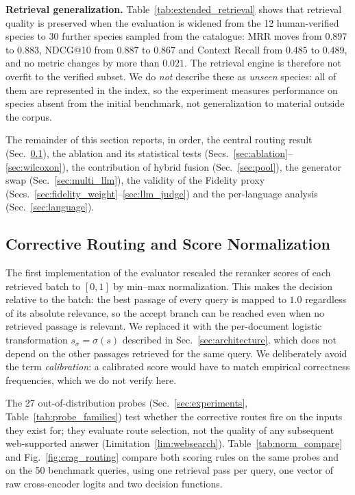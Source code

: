 \documentclass[runningheads]{llncs}
\begin{document}
\textbf{Retrieval generalization.} Table~\ref{tab:extended_retrieval} shows that retrieval quality is preserved when the evaluation is widened from the 12 human-verified species to 30 further species sampled from the catalogue: MRR moves from $0.897$ to $0.883$, NDCG@10 from $0.887$ to $0.867$ and Context Recall from $0.485$ to $0.489$, and no metric changes by more than $0.021$. The retrieval engine is therefore not overfit to the verified subset. We do \emph{not} describe these as \emph{unseen} species: all of them are represented in the index, so the experiment measures performance on species absent from the initial benchmark, not generalization to material outside the corpus.

The remainder of this section reports, in order, the central routing result (Sec.~\ref{sec:crag_validation}), the ablation and its statistical tests (Secs.~\ref{sec:ablation}--\ref{sec:wilcoxon}), the contribution of hybrid fusion (Sec.~\ref{sec:pool}), the generator swap (Sec.~\ref{sec:multi_llm}), the validity of the Fidelity proxy (Secs.~\ref{sec:fidelity_weight}--\ref{sec:llm_judge}) and the per-language analysis (Sec.~\ref{sec:language}).

\subsection{Corrective Routing and Score Normalization}
\label{sec:crag_validation}

The first implementation of the evaluator rescaled the reranker scores of each retrieved batch to $[0,1]$ by min--max normalization. This makes the decision relative to the batch: the best passage of every query is mapped to $1.0$ regardless of its absolute relevance, so the accept branch can be reached even when no retrieved passage is relevant. We replaced it with the per-document logistic transformation $s_\sigma{=}\sigma(s)$ described in Sec.~\ref{sec:architecture}, which does not depend on the other passages retrieved for the same query. We deliberately avoid the term \emph{calibration}: a calibrated score would have to match empirical correctness frequencies, which we do not verify here.

The 27 out-of-distribution probes (Sec.~\ref{sec:experiments}, Table~\ref{tab:probe_families}) test whether the corrective routes fire on the inputs they exist for; they evaluate route selection, not the quality of any subsequent web-supported answer (Limitation~\ref{lim:websearch}). Table~\ref{tab:norm_compare} and Fig.~\ref{fig:crag_routing} compare both scoring rules on the same probes and on the 50 benchmark queries, using one retrieval pass per query, one vector of raw cross-encoder logits and two decision functions.
\end{document}

